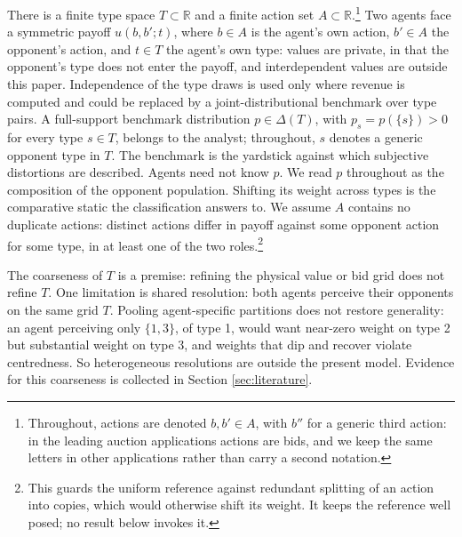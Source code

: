 \documentclass[12pt]{article}
\theoremstyle{definition}
\begin{document}

There is a finite type space $T \subset \mathbb{R}$ and a finite action set $A \subset \mathbb{R}$.\footnote{Throughout, actions are denoted $b, b' \in A$, with $b''$ for a generic third action: in the leading auction applications actions are bids, and we keep the same letters in other applications rather than carry a second notation.} Two agents face a symmetric payoff $u(b, b'; t)$, where $b \in A$ is the agent's own action, $b' \in A$ the opponent's action, and $t \in T$ the agent's own type: values are private, in that the opponent's type does not enter the payoff, and interdependent values are outside this paper. Independence of the type draws is used only where revenue is computed and could be replaced by a joint-distributional benchmark over type pairs. A full-support benchmark distribution $p \in \Delta(T)$, with $p_s = p(\{s\}) > 0$ for every type $s \in T$, belongs to the analyst; throughout, $s$ denotes a generic opponent type in $T$. The benchmark is the yardstick against which subjective distortions are described. Agents need not know $p$. We read $p$ throughout as the composition of the opponent population. Shifting its weight across types is the comparative static the classification answers to. We assume $A$ contains no duplicate actions: distinct actions differ in payoff against some opponent action for some type, in at least one of the two roles.\footnote{This guards the uniform reference against redundant splitting of an action into copies, which would otherwise shift its weight. It keeps the reference well posed; no result below invokes it.}

The coarseness of $T$ is a premise: refining the physical value or bid grid does not refine $T$. One limitation is shared resolution: both agents perceive their opponents on the same grid $T$. Pooling agent-specific partitions does not restore generality: an agent perceiving only $\{1, 3\}$, of type 1, would want near-zero weight on type 2 but substantial weight on type 3, and weights that dip and recover violate centredness. So heterogeneous resolutions are outside the present model. Evidence for this coarseness is collected in Section \ref{sec:literature}.
\end{document}
